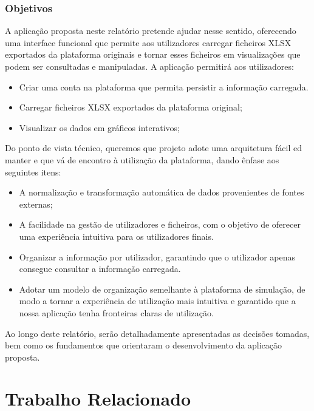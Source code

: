 \subsection{Objetivos}

A aplicação proposta neste relatório pretende ajudar nesse sentido, oferecendo uma interface  funcional que permite aos utilizadores carregar ficheiros XLSX exportados da plataforma originais e tornar esses ficheiros em visualizações que podem ser consultadas e manipuladas. A aplicação permitirá aos utilizadores:
\begin{itemize}
    \item Criar uma conta na plataforma que permita persistir a informação carregada.
    \item Carregar ficheiros XLSX exportados da plataforma original;
    \item Visualizar os dados em gráficos interativos;
\end{itemize}

Do ponto de vista técnico, queremos que  projeto adote uma arquitetura fácil ed manter e que vá de encontro à utilização da plataforma, dando ênfase aos seguintes itens:
\begin{itemize}
    \item A normalização e transformação automática de dados provenientes de fontes externas;
    \item A facilidade na gestão de utilizadores e ficheiros, com o objetivo de oferecer uma experiência intuitiva para os utilizadores finais.
    \item Organizar a informação por utilizador, garantindo que o utilizador apenas consegue consultar a informação carregada.
    \item Adotar um modelo de organização semelhante à plataforma de simulação, de modo a tornar a experiência de utilização mais intuitiva e garantido que a nossa aplicação tenha fronteiras claras de utilização.
\end{itemize}

Ao longo deste relatório, serão detalhadamente apresentadas as decisões tomadas, bem como os fundamentos que orientaram o desenvolvimento da aplicação proposta.

\chapter{Trabalho Relacionado}
\label{ch:trabalhoRelacionado}

